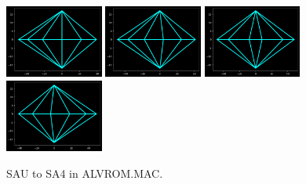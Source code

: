 \begin{figure}[H]
  {
        \includegraphics[width=3.22cm]{src/tempest_unused/SAU.png}%
        \hspace{-0.2cm}
        \includegraphics[width=3.22cm]{src/tempest_unused/SA2.png}%
        \hspace{-0.2cm}
        \includegraphics[width=3.22cm]{src/tempest_unused/SA3.png}%
        \hspace{-0.2cm}
        \includegraphics[width=3.22cm]{src/tempest_unused/SA4.png}%
        \vspace{-0.2cm}
  }\caption*{SAU to SA4 in ALVROM.MAC.}
\end{figure}

